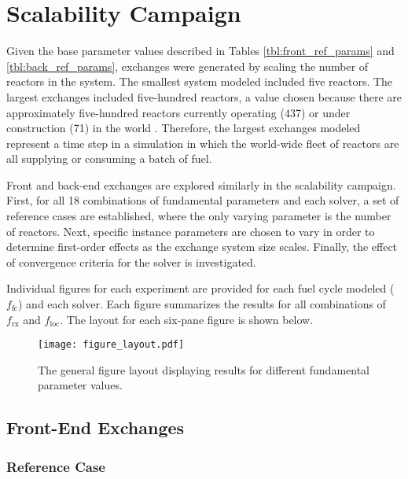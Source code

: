 
\section{Scalability Campaign}\label{results:scale}

Given the base parameter values described in Tables \ref{tbl:front_ref_params}
and \ref{tbl:back_ref_params}, exchanges were generated by scaling the number of
reactors in the system. The smallest system modeled included five reactors. The
largest exchanges included five-hundred reactors, a value chosen because there
are approximately five-hundred reactors currently operating (437) or under
construction (71) in the world \cite{nrxtrs}. Therefore, the largest exchanges
modeled represent a time step in a simulation in which the world-wide fleet of
reactors are all supplying or consuming a batch of fuel.

Front and back-end exchanges are explored similarly in the scalability
campaign. First, for all 18 combinations of fundamental parameters and each
solver, a set of reference cases are established, where the only varying
parameter is the number of reactors. Next, specific instance parameters are
chosen to vary in order to determine first-order effects as the exchange system
size scales. Finally, the effect of convergence criteria for the \cbc solver is
investigated.

Individual figures for each experiment are provided for each fuel cycle modeled
($f_\text{fc}$) and each solver. Each figure summarizes the results for all
combinations of $f_\text{rx}$ and $f_\text{loc}$. The layout for each six-pane
figure is shown below.

\begin{figure}[h!]
  \begin{center}
    \texttt{[image: figure\_layout.pdf]}
    \caption{
      \label{fig:figure_layout}
      The general figure layout displaying results for different fundamental
      parameter values.}
  \end{center}
\end{figure}

\subsection{Front-End Exchanges}

\subsubsection{Reference Case}


